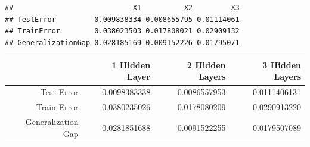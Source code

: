 \begin{Shaded}
\begin{Highlighting}[]
\NormalTok{(}\NormalTok{)}
\OtherTok{\textless{}{-}} \SpecialCharTok{\textasciitilde{}}
                  \NormalTok{,}
                  \NormalTok{(}\NormalTok{,}\NormalTok{,}\NormalTok{))}

\OtherTok{\textless{}{-}}  \NormalTok{(}\SpecialCharTok{$}

\OtherTok{\textless{}{-}} \SpecialCharTok{{-}}\SpecialCharTok{$}\SpecialCharTok{\^{}}\NormalTok{)}
\OtherTok{\textless{}{-}}\SpecialCharTok{$}\NormalTok{result.matrix[}\NormalTok{,]}

\OtherTok{\textless{}{-}} \NormalTok{(TestErr1,TestErr2,TestErr3)[}\SpecialCharTok{:}\NormalTok{]}
\OtherTok{\textless{}{-}} \NormalTok{(TrainErr1, TrainErr2, TrainErr3)[}\SpecialCharTok{:}\NormalTok{]}
\OtherTok{\textless{}{-}}\SpecialCharTok{{-}}

\NormalTok{(}
\end{Highlighting}
\end{Shaded}

\begin{verbatim}
##                            X1          X2         X3
## TestError         0.009838334 0.008655795 0.01114061
## TrainError        0.038023503 0.017808021 0.02909132
## GeneralizationGap 0.028185169 0.009152226 0.01795071
\end{verbatim}

\begin{table}[ht]
\centering
\begin{tabular}{rrrr}
  \hline
 & 1 Hidden Layer & 2 Hidden Layers & 3 Hidden Layers \\ 
  \hline
Test Error & 0.0098383338 & 0.0086557953 & 0.0111406131 \\ 
  Train Error & 0.0380235026 & 0.0178080209 & 0.0290913220 \\ 
  Generalization Gap & 0.0281851688 & 0.0091522255 & 0.0179507089 \\ 
   \hline
\end{tabular}
\end{table}

